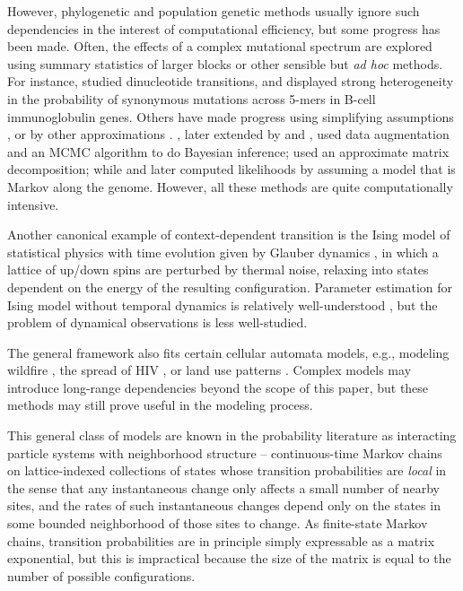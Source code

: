 \documentclass{article}
\theoremstyle{plain}
\theoremstyle{definition}
\begin{document}
However, phylogenetic and population genetic methods usually ignore such dependencies
in the interest of computational efficiency,
but some progress has been made.
Often, the effects of a complex mutational spectrum are explored using summary statistics of larger blocks or other sensible but \textit{ad hoc} methods.
For instance, \citet{arndt2003sequence} studied dinucleotide transitions,
and \citet{yaari2013models} displayed strong heterogeneity in the probability of synonymous mutations across 5-mers
in B-cell immunoglobulin genes.
Others have made progress using simplifying assumptions \citep{berard2012accurate},
or by other approximations \citep{christensen2005pseudolikelihood,saunders2007insights}.
\citet{pedersen2000dependent}, later extended by
\citet{Hwang2004-pj,hobolth2008markov} and \citet{baele2010using}, used data augmentation and an MCMC algorithm to do Bayesian inference;
\citet{lunter2004nucleotide} used an approximate matrix decomposition;
while \citet{siepel2004phylogenetic} and later \citep{baele2010modelling} computed likelihoods by assuming a model that is Markov along the genome.
However, all these methods are quite computationally intensive.


Another canonical example of context-dependent transition is the Ising model of statistical physics
with time evolution given by Glauber dynamics \citep{glauber1963timedependent},
in which a lattice of up/down spins are perturbed by thermal noise,
relaxing into states dependent on the energy of the resulting configuration.
Parameter estimation for Ising model without temporal dynamics
is relatively well-understood \citep{pickard1982inference,frigessi1990parameter},
but the problem of dynamical observations is less well-studied.

The general framework also fits certain cellular automata models,
e.g., modeling wildfire \citep{clarke1994cellular},
the spread of HIV \citep{zorzenondossantos2001dynamics},
or land use patterns \citep{wu2002calibration}.
Complex models may introduce long-range dependencies beyond the scope of this paper,
but these methods may still prove useful in the modeling process.


This general class of models are known in the probability literature as
interacting particle systems \citep{liggett2005ips} with neighborhood structure
-- continuous-time Markov chains on lattice-indexed collections of states
whose transition probabilities are \emph{local}
in the sense that any instantaneous change only affects a small number of nearby sites,
and the rates of such instantaneous changes depend only on the states in some bounded neighborhood of those sites to change.
As finite-state Markov chains,
transition probabilities are in principle simply expressable as a matrix exponential,
but this is impractical because the size of the matrix is equal to the number of possible configurations.
\end{document}
